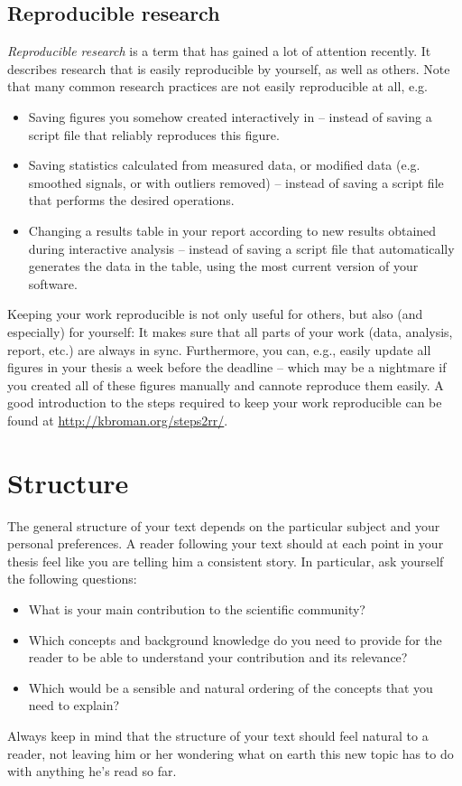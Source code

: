 \subsection{Reproducible research}
\emph{Reproducible research} is a term that has gained a lot of attention recently.
It describes research that is easily reproducible by yourself, as well as others.
Note that many common research practices are not easily reproducible at all, e.g.
\begin{itemize}
\item Saving figures you somehow created interactively in  -- instead of saving a script file that reliably reproduces this figure.
\item Saving statistics calculated from measured data, or modified data (e.g. smoothed signals, or with outliers removed) -- instead of saving a script file that performs the desired operations.
\item Changing a results table in your report according to new results obtained during interactive analysis -- instead of saving a script file that automatically generates the data in the table, using the most current version of your software.
\end{itemize}
Keeping your work reproducible is not only useful for others, but also (and especially) for yourself: It makes sure that all parts of your work (data, analysis, report, etc.) are always in sync.
Furthermore, you can, e.g., easily update all figures in your thesis a week before the deadline -- which may be a nightmare if you created all of these figures manually and cannote reproduce them easily.
A good introduction to the steps required to keep your work reproducible can be found at \url{http://kbroman.org/steps2rr/}.

\section{Structure}
The general structure of your text depends on the particular subject and your personal preferences.
A reader following your text should at each point in your thesis feel like you are telling him a consistent story.
In particular, ask yourself the following questions:
\begin{itemize}
\item What is your main contribution to the scientific community? 
\item Which concepts and background knowledge do you need to provide for the reader to be able to understand your contribution and its relevance?
\item Which would be a sensible and natural ordering of the concepts that you need to explain?
\end{itemize}
Always keep in mind that the structure of your text should feel natural to a reader, not leaving him or her wondering what on earth this new topic has to do with anything he's read so far.

